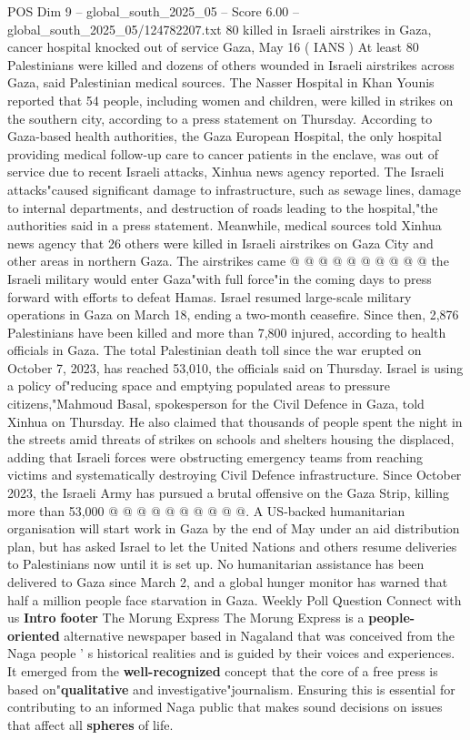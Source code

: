 \begin{textsample}{POS Dim 9 – global\_south\_2025\_05 – Score 6.00 – global\_south\_2025\_05/124782207.txt}  \label{ex:f9_pos_203}
80 killed in Israeli airstrikes in Gaza, cancer hospital knocked out of service Gaza, May 16 ( IANS ) At least 80 Palestinians were killed and dozens of others wounded in Israeli airstrikes across Gaza, said Palestinian medical sources.
The Nasser Hospital in Khan Younis reported that 54 people, including women and children, were killed in strikes on the southern city, according to a press statement on Thursday.
According to Gaza-based health authorities, the Gaza European Hospital, the only hospital providing medical follow-up care to cancer patients in the enclave, was out of service due to recent Israeli attacks, Xinhua news agency reported.
The Israeli attacks"caused significant damage to infrastructure, such as sewage lines, damage to internal departments, and destruction of roads leading to the hospital,"the authorities said in a press statement.
Meanwhile, medical sources told Xinhua news agency that 26 others were killed in Israeli airstrikes on Gaza City and other areas in northern Gaza.
The airstrikes came @ @ @ @ @ @ @ @ @ @ the Israeli military would enter Gaza"with full force"in the coming days to press forward with efforts to defeat Hamas.
Israel resumed large-scale military operations in Gaza on March 18, ending a two-month ceasefire.
Since then, 2,876 Palestinians have been killed and more than 7,800 injured, according to health officials in Gaza.
The total Palestinian death toll since the war erupted on October 7, 2023, has reached 53,010, the officials said on Thursday.
Israel is using a policy of"reducing space and emptying populated areas to pressure citizens,"Mahmoud Basal, spokesperson for the Civil Defence in Gaza, told Xinhua on Thursday.
He also claimed that thousands of people spent the night in the streets amid threats of strikes on schools and shelters housing the displaced, adding that Israeli forces were obstructing emergency teams from reaching victims and systematically destroying Civil Defence infrastructure.
Since October 2023, the Israeli Army has pursued a brutal offensive on the Gaza Strip, killing more than 53,000 @ @ @ @ @ @ @ @ @ @.
A US-backed humanitarian organisation will start work in Gaza by the end of May under an aid distribution plan, but has asked Israel to let the United Nations and others resume deliveries to Palestinians now until it is set up.
No humanitarian assistance has been delivered to Gaza since March 2, and a global hunger monitor has warned that half a million people face starvation in Gaza.
Weekly Poll Question Connect with us \textbf{Intro} \textbf{footer} The Morung Express The Morung Express is a \textbf{people-oriented} alternative newspaper based in Nagaland that was conceived from the Naga people ' s historical realities and is guided by their voices and experiences.
It emerged from the \textbf{well-recognized} concept that the core of a free press is based on"\textbf{qualitative} and investigative"journalism.
Ensuring this is essential for contributing to an informed Naga public that makes sound decisions on issues that affect all \textbf{spheres} of life.

\end{textsample}
